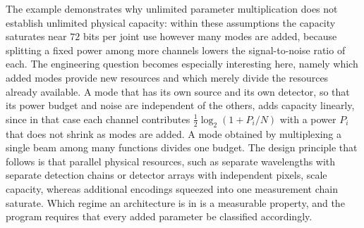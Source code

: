 The example demonstrates why unlimited parameter multiplication does not establish unlimited physical capacity: within these assumptions the capacity saturates near $72$ bits per joint use however many modes are added, because splitting a fixed power among more channels lowers the signal-to-noise ratio of each. The engineering question becomes especially interesting here, namely which added modes provide new resources and which merely divide the resources already available. A mode that has its own source and its own detector, so that its power budget and noise are independent of the others, adds capacity linearly, since in that case each channel contributes $\tfrac12\log_2(1+P_i/N)$ with a power $P_i$ that does not shrink as modes are added. A mode obtained by multiplexing a single beam among many functions divides one budget. The design principle that follows is that parallel physical resources, such as separate wavelengths with separate detection chains or detector arrays with independent pixels, scale capacity, whereas additional encodings squeezed into one measurement chain saturate. Which regime an architecture is in is a measurable property, and the program requires that every added parameter be classified accordingly.
